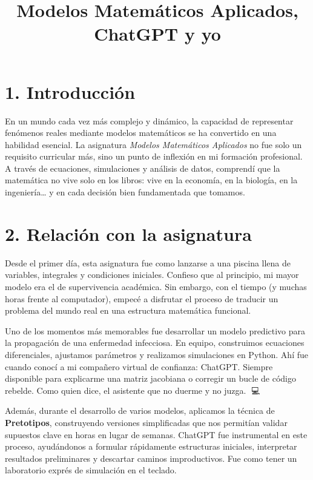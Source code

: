 \documentclass[12pt]{article}
\title{\textbf{Modelos Matemáticos Aplicados, ChatGPT y yo}}
\author{}
\date{}
\begin{document}
\maketitle

\section*{1. Introducción}

En un mundo cada vez más complejo y dinámico, la capacidad de representar fenómenos reales mediante modelos matemáticos se ha convertido en una habilidad esencial. La asignatura \textit{Modelos Matemáticos Aplicados} no fue solo un requisito curricular más, sino un punto de inflexión en mi formación profesional. A través de ecuaciones, simulaciones y análisis de datos, comprendí que la matemática no vive solo en los libros: vive en la economía, en la biología, en la ingeniería… y en cada decisión bien fundamentada que tomamos.

\section*{2. Relación con la asignatura}

Desde el primer día, esta asignatura fue como lanzarse a una piscina llena de variables, integrales y condiciones iniciales. Confieso que al principio, mi mayor modelo era el de supervivencia académica. Sin embargo, con el tiempo (y muchas horas frente al computador), empecé a disfrutar el proceso de traducir un problema del mundo real en una estructura matemática funcional.

Uno de los momentos más memorables fue desarrollar un modelo predictivo para la propagación de una enfermedad infecciosa. En equipo, construimos ecuaciones diferenciales, ajustamos parámetros y realizamos simulaciones en Python. Ahí fue cuando conocí a mi compañero virtual de confianza: ChatGPT. Siempre disponible para explicarme una matriz jacobiana o corregir un bucle de código rebelde. Como quien dice, el asistente que no duerme y no juzga. 🤖💻

Además, durante el desarrollo de varios modelos, aplicamos la técnica de \textbf{Pretotipos}, construyendo versiones simplificadas que nos permitían validar supuestos clave en horas en lugar de semanas. ChatGPT fue instrumental en este proceso, ayudándonos a formular rápidamente estructuras iniciales, interpretar resultados preliminares y descartar caminos improductivos. Fue como tener un laboratorio exprés de simulación en el teclado.
\end{document}
